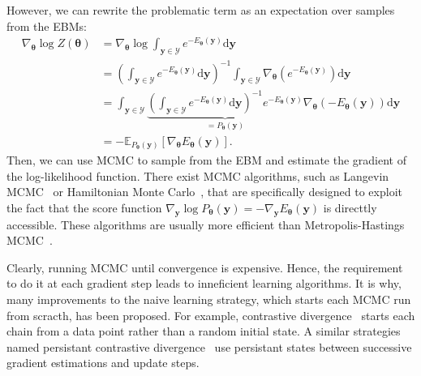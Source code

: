 However, we can rewrite the problematic term as an expectation over samples from the EBMs:
\begin{align}
\nabla_{\bm{\theta}} \log Z(\bm{\theta}) &= \nabla_{\bm{\theta}} \log \int_{\bm{y}\in \mathcal{Y}}e^{-E_{\bm{\theta}}(\bm{y})} \text{d}\bm{y}\\
&= \left( \int_{\bm{y}\in \mathcal{Y}}e^{-E_{\bm{\theta}}(\bm{y})} \text{d}\bm{y} \right)^{-1} \int_{\bm{y}\in \mathcal{Y}}
\nabla_{\bm{\theta}}\left( e^{-E_{\bm{\theta}}(\bm{y})}  \right) \text{d}\bm{y}\\
&= \int_{\bm{y}\in \mathcal{Y}} \underbrace{\left( \int_{\bm{y}\in \mathcal{Y}}e^{-E_{\bm{\theta}}(\bm{y})} \text{d}\bm{y} \right)^{-1}
e^{-E_{\bm{\theta}}(\bm{y})}}_{=P_{\bm{\theta}}(\bm{y})} \nabla_{\bm{\theta}}\left(-E_{\bm{\theta}}(\bm{y})\right) \text{d}\bm{y}\\
&= -\mathbb{E}_{P_{\bm{\theta}}(\bm{y})}\left[ \nabla_{\bm{\theta}}E_{\bm{\theta}}(\bm{y}) \right].
\end{align}
Then, we can use MCMC to sample from the EBM and estimate the gradient of the log-likelihood function. There exist MCMC algorithms, such as Langevin MCMC~\citep{parisi1981correlation, grenander1994representations} or Hamiltonian Monte Carlo~\citep{duane1987hybrid, neal2011mcmc}, that are specifically designed to exploit the fact that the score function $\nabla_{\bm{y}} \log P_{\bm{\theta}}(\bm{y}) = -\nabla_{\bm{y}} E_{\bm{\theta}}(\bm{y})$ is directtly accessible. These algorithms are usually more efficient than Metropolis-Hastings MCMC~\citep{hastings1970monte}.

Clearly, running MCMC until convergence is expensive. Hence, the requirement to do it at each gradient step leads to inneficient learning algorithms. It is why, many improvements to the naive learning strategy, which starts each MCMC run from scracth, has been proposed. For example, contrastive divergence~\citep{hinton2002training} starts each chain from a data point rather than a random initial state. A similar strategies named persistant contrastive divergence~\citep{tieleman2008training} use persistant states between successive gradient estimations and update steps.
%

